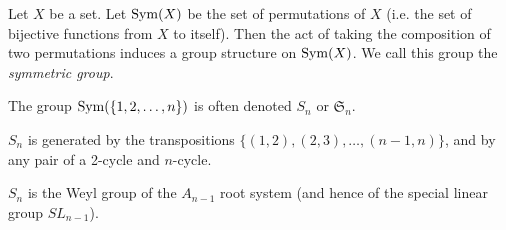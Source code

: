 \documentclass[12pt]{article}
\begin{document}
Let $X$ be a set.  
Let ${\rm Sym}(X)$ be the set of permutations of $X$ 
(i.e. the set of bijective functions from $X$ to itself).  
Then the act of taking the composition of two permutations 
induces a group structure on ${\rm Sym}(X)$.  
We call this group the {\it symmetric group}.

The group ${\rm Sym}(\{1,2,\ldots, n\})$ is often denoted $S_n$ or $\mathfrak{S}_n$.

$S_n$ is generated by the transpositions $\{(1,2),(2,3),\ldots,(n-1,n)\}$,
and by any pair of a 2-cycle and $n$-cycle.

$S_n$ is the Weyl group of the $A_{n-1}$ root system (and hence of the special linear group $SL_{n-1}$).
\end{document}
